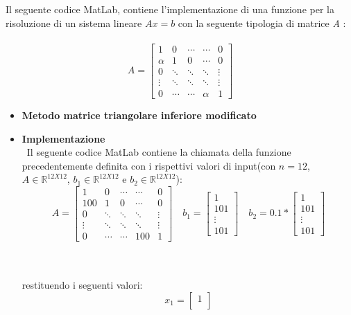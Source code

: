 Il seguente codice MatLab, contiene l'implementazione di una funzione per la risoluzione di un sistema lineare $Ax = b$ con la seguente tipologia di matrice \textit{A} :\\\
	\[
	A = \begin{bmatrix}
		1 & 0 & \cdots & \cdots & 0 \\
		\alpha & 1 & 0 & \cdots & 0 \\
		0 & \ddots & \ddots  & \ddots & \vdots \\
		\vdots & \ddots & \ddots & \ddots & \vdots \\
		0 & \cdots & \cdots & \alpha & 1
  	\end{bmatrix}
  	\]
\begin{itemize}
	\item \textbf{Metodo matrice triangolare inferiore modificato}
		
	\item \textbf{Implementazione}\\\
		Il seguente codice MatLab contiene la chiamata della funzione precedentemente definita con i rispettivi valori di input(con $n=12$, $A \in \mathbb{R}^{12X12}$, $b_1 \in \mathbb{R}^{12X12}$ e $b_2 \in \mathbb{R}^{12X12}$):
		\[
		A = \begin{bmatrix}
			1 & 0 & \cdots & \cdots & 0 \\
			100 & 1 & 0 & \cdots & 0 \\
			0 & \ddots & \ddots  & \ddots & \vdots \\
			\vdots & \ddots & \ddots & \ddots & \vdots \\
			0 & \cdots & \cdots & 100 & 1
			\end{bmatrix} \quad
		b_1 = \begin{bmatrix}
			1 \\
 			101 \\
 	 		\vdots \\
	  		101 
  		\end{bmatrix} \quad
  		b_2 = 0.1*\begin{bmatrix}
			1 \\
 			101 \\
 	 		\vdots \\
	  		101 
  		\end{bmatrix} 
  		\]\\\
  		
  		restituendo i seguenti valori:
  		\[
  		x_1 = \begin{bmatrix}
  			1   \\

\end{bmatrix}\]
\end{itemize}
